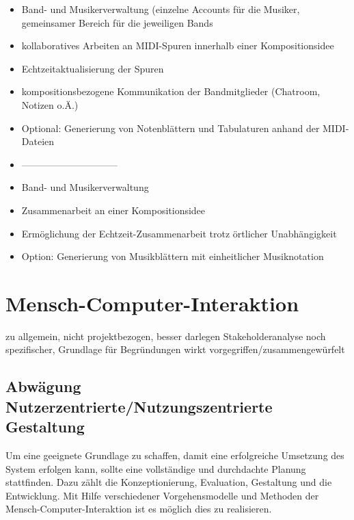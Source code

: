 \documentclass[12pt]{scrartcl}
\begin{document}
\begin{itemize}
\item Band- und Musikerverwaltung (einzelne Accounts für die Musiker, gemeinsamer Bereich für die jeweiligen Bands
\item kollaboratives Arbeiten an MIDI-Spuren innerhalb einer Kompositionsidee
\item Echtzeitaktualisierung der Spuren
\item kompositionsbezogene Kommunikation der Bandmitglieder (Chatroom, Notizen o.Ä.)
\item Optional: Generierung von Notenblättern und Tabulaturen anhand der MIDI-Dateien
\item ------------------------------
\item Band- und Musikerverwaltung
\item Zusammenarbeit an einer Kompositionsidee 
\item Ermöglichung der Echtzeit-Zusammenarbeit trotz örtlicher Unabhängigkeit
\item Option: Generierung von Musikblättern mit einheitlicher Musiknotation
\end{itemize}








\section{Mensch-Computer-Interaktion}

zu allgemein, nicht projektbezogen, besser darlegen
Stakeholderanalyse noch spezifischer, Grundlage für Begründungen
wirkt vorgegriffen/zusammengewürfelt

\subsection{Abwägung Nutzerzentrierte/Nutzungszentrierte Gestaltung}
Um eine geeignete Grundlage zu schaffen, damit eine erfolgreiche Umsetzung des System erfolgen kann, sollte eine vollständige und durchdachte Planung stattfinden. Dazu zählt die Konzeptionierung, Evaluation, Gestaltung und die Entwicklung. 
Mit Hilfe verschiedener Vorgehensmodelle und Methoden der Mensch-Computer-Interaktion ist es möglich dies zu realisieren.
\end{document}
